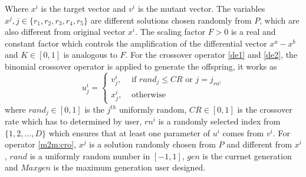 \documentclass[journal]{IEEEtran}
\begin{document}
Where $x^i$ is the target vector and $v^i$ is the mutant vector. The variables $x^j, j \in \{r_1,r_2,r_3,r_4,r_5\}$ are different solutions chosen randomly from $P$, which are also different from original vector $x^i$. The scaling factor $F > 0$ is a real and constant factor which controls the amplification of the differential vector $x^a-x^b$ and $K \in [0,1]$ is analogous to $F$. For the crossover operator \ref{de1} and \ref{de2}, the binomial crossover operator \cite{storn1997differential} is applied to generate the offspring, it works as
\begin{equation}
  u_{j}^{i}=\left\{\begin{array}{ll}
    v_{j}^{i}, & \text { if }  { rand_j } \leq C R \text { or } j=j_{ {rn^i }} \\
    x_{j}^{i}, & \text { otherwise }
  \end{array}\right.
\end{equation}
where $rand_j \in [0,1]$ is the $j^{th}$ uniformly random, $CR \in [0,1]$ is the crossover rate which has to determined by user, $rn^i$ is a randomly selected index from $\{1,2,\dots,D\}$ which ensures that at least one parameter of $u^i$ comes from $v^i$.
For operator \ref{m2m:cro}, $x^j$ is a solution randomly chosen from $P$ and different from $x^i$, $rand$ is a uniformly random number in $[-1,1]$, $gen$ is the currnet generation and $Maxgen$ is the maximum generation user designed.
\end{document}
